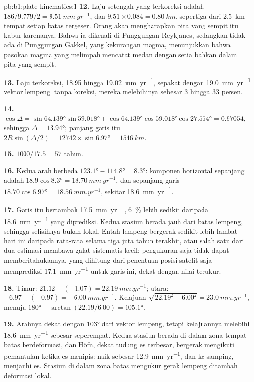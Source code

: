 \begin{solution}{pb:b1:plate-kinematics:1}
\textbf{12.} Laju setengah yang terkoreksi adalah $186/9.779/2 = \qty{9.51}{mm.yr^{-1}}$,
dan $9.51\times0.084 = \qty{0.80}{km}$, sepertiga dari \qty{2.5}{km} tempat
setiap batas tergeser. Orang akan mengharapkan pita yang sempit itu kabur
karenanya. Bahwa ia dikenali di Punggungan Reykjanes, sedangkan tidak ada di
Punggungan Gakkel, yang kekurangan magma, menunjukkan bahwa pasokan magma yang melimpah
mencatat medan dengan setia bahkan dalam pita yang sempit.

\textbf{13.} Laju terkoreksi, 18.95 hingga \qty{19.02}{mm.yr^{-1}}, sepakat dengan
\qty{19.0}{mm.yr^{-1}} vektor lempeng; tanpa koreksi, mereka melebihinya sebesar 3 hingga 33 persen.

\textbf{14.} $\cos\Delta = \sin\ang{64.139}\sin\ang{59.018} +
\cos\ang{64.139}\cos\ang{59.018}\cos\ang{27.554} = 0.97054$, sehingga $\Delta =
\ang{13.94}$; panjang garis itu $2R\sin(\Delta/2) = 12742\times\sin\ang{6.97} =
\qty{1546}{km}$.

\textbf{15.} $1000/17.5 = 57$ tahun.

\textbf{16.} Kedua arah berbeda $\ang{123.1} - \ang{114.8} =
\ang{8.3}$: komponen horizontal sepanjang  adalah
$18.9\cos\ang{8.3} = \qty{18.70}{mm.yr^{-1}}$, dan sepanjang garis
$18.70\cos\ang{6.97} = \qty{18.56}{mm.yr^{-1}}$, sekitar \qty{18.6}{mm.yr^{-1}}.

\textbf{17.} Garis itu bertambah \qty{17.5}{mm.yr^{-1}}, \qty{6}{\percent}
lebih sedikit daripada \qty{18.6}{mm.yr^{-1}} yang diprediksi. Kedua stasiun berada jauh dari batas lempeng, sehingga selisihnya bukan lokal. Entah lempeng bergerak sedikit lebih lambat hari ini daripada rata-rata selama tiga juta tahun terakhir, atau salah satu dari dua estimasi membawa galat sistematis kecil; pengukuran saja tidak dapat memberitahukannya.  yang dihitung dari penentuan posisi satelit saja memprediksi \qty{17.1}{mm.yr^{-1}} untuk garis ini, dekat dengan nilai terukur.

\textbf{18.} Timur: $21.12 - (-1.07) = \qty{22.19}{mm.yr^{-1}}$; utara:
$-6.97 - (-0.97) = \qty{-6.00}{mm.yr^{-1}}$. Kelajuan $\sqrt{22.19^2 + 6.00^2} =
\qty{23.0}{mm.yr^{-1}}$, menuju $\ang{180} - \arctan(22.19/6.00) =
\ang{105.1}$.

\textbf{19.} Arahnya dekat dengan \ang{103} dari vektor lempeng, tetapi kelajuannya melebihi \qty{18.6}{mm.yr^{-1}} sebesar seperempat. Kedua stasiun berada di dalam zona tempat batas berdeformasi, dan Höfn, dekat tudung es terbesar, bergerak mengikuti pemantulan  ketika es menipis: naik sebesar \qty{12.9}{mm.yr^{-1}}, dan ke samping, menjauhi es. Stasiun di dalam zona batas mengukur gerak lempeng ditambah deformasi lokal.


\end{solution}
